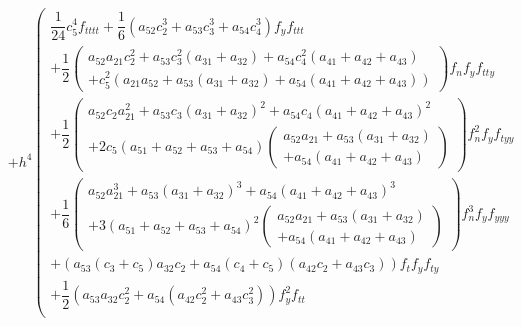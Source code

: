 \documentclass[a4paper,oneside]{book}
\numberwithin{equation}{chapter}
\begin{document}
\begin{align}
& + {h^4}\left( \begin{array}{l}
\dfrac{1}{{24}}c_5^4{f_{tttt}} + \dfrac{1}{6}\left( {{a_{52}}c_2^3 + {a_{53}}c_3^3 + {a_{54}}c_4^3} \right){f_y}{f_{ttt}}\\
 + \dfrac{1}{2}\left( \begin{array}{l}
{a_{52}}{a_{21}}c_2^2 + {a_{53}}c_3^2\left( {{a_{31}} + {a_{32}}} \right) + {a_{54}}c_4^2\left( {{a_{41}} + {a_{42}} + {a_{43}}} \right)\\
 + c_5^2\left( {{a_{21}}{a_{52}} + {a_{53}}\left( {{a_{31}} + {a_{32}}} \right) + {a_{54}}\left( {{a_{41}} + {a_{42}} + {a_{43}}} \right)} \right)
\end{array} \right){f_n}{f_y}{f_{tty}}\\
 + \dfrac{1}{2}\left( \begin{array}{l}
{a_{52}}{c_2}a_{21}^2 + {a_{53}}{c_3}{\left( {{a_{31}} + {a_{32}}} \right)^2} + {a_{54}}{c_4}{\left( {{a_{41}} + {a_{42}} + {a_{43}}} \right)^2}\\
 + 2{c_5}\left( {{a_{51}} + {a_{52}} + {a_{53}} + {a_{54}}} \right)\left( \begin{array}{l}
{a_{52}}{a_{21}} + {a_{53}}\left( {{a_{31}} + {a_{32}}} \right)\\
 + {a_{54}}\left( {{a_{41}} + {a_{42}} + {a_{43}}} \right)
\end{array} \right)
\end{array} \right)f_n^2{f_y}{f_{tyy}}\\
 + \dfrac{1}{6}\left( \begin{array}{l}
{a_{52}}a_{21}^3 + {a_{53}}{\left( {{a_{31}} + {a_{32}}} \right)^3} + {a_{54}}{\left( {{a_{41}} + {a_{42}} + {a_{43}}} \right)^3}\\
 + 3{\left( {{a_{51}} + {a_{52}} + {a_{53}} + {a_{54}}} \right)^2}\left( \begin{array}{l}
{a_{52}}{a_{21}} + {a_{53}}\left( {{a_{31}} + {a_{32}}} \right)\\
 + {a_{54}}\left( {{a_{41}} + {a_{42}} + {a_{43}}} \right)
\end{array} \right)
\end{array} \right)f_n^3{f_y}{f_{yyy}}\\
 + \left( {{a_{53}}\left( {{c_3} + {c_5}} \right){a_{32}}{c_2} + {a_{54}}\left( {{c_4} + {c_5}} \right)\left( {{a_{42}}{c_2} + {a_{43}}{c_3}} \right)} \right){f_t}{f_y}{f_{ty}}\\
 + \dfrac{1}{2}\left( {{a_{53}}{a_{32}}c_2^2 + {a_{54}}\left( {{a_{42}}c_2^2 + {a_{43}}c_3^2} \right)} \right)f_y^2{f_{tt}}\\

\end{array}
\end{align}
\end{document}
